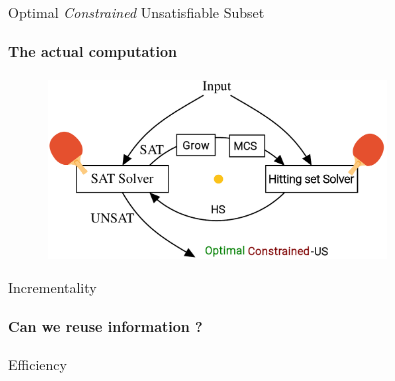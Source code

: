 \documentclass[handout]{beamer}
\begin{document}
	\begin{frame}{Optimal \emph{Constrained} Unsatisfiable Subset}
	\framesubtitle{The actual computation}
	
	\begin{figure}
		\includegraphics[width=0.8\textwidth]{ihs_constrained_ping_pong.png}
	\end{figure}
	\end{frame}

	\begin{frame}{Incrementality}
	\framesubtitle{Can we reuse information ?}
	
	
	\end{frame}

	\begin{frame}{Efficiency}
	
	
	\end{frame}
\end{document}
